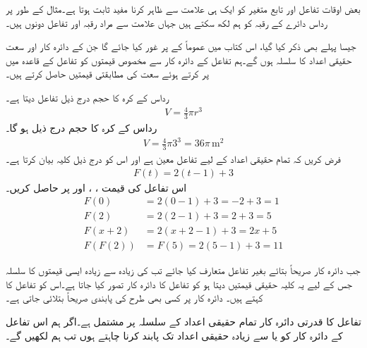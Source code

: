 بعض اوقات تفاعل اور تابع متغیر کو ایک ہی علامت سے ظاہر کرنا مفید ثابت ہوتا ہے۔مثال کے طور پر رداس  دائرے کے رقبہ کو ہم  لکھ سکتے ہیں جہاں علامت  سے مراد رقبہ اور تفاعل دونوں ہیں۔

جیسا پہلے بھی ذکر کیا گیا، اس کتاب میں عموماً  کے  پر غور کیا جائے گا جن کے دائرہ کار اور سعت حقیقی اعداد کا سلسلہ ہوں گے۔ہم تفاعل کے دائرہ کار سے مخصوص قیمتوں کو تفاعل کے قاعدہ میں پر کرتے ہوئے سعت کی مطابقتی قیمتیں حاصل کرتے ہیں۔

رداس  کے کرہ کا حجم  درج ذیل تفاعل دیتا ہے۔
\begin{align*}
V=\frac{4}{3}\pi r^3
\end{align*}
  رداس کے کرہ کا حجم درج ذیل ہو گا۔
\begin{align*}
V=\frac{4}{3}\pi 3^3=36\pi \, \si{\meter\squared}
\end{align*}
فرض کریں کہ تمام حقیقی اعداد  کے لیے  تفاعل معین ہے اور اس کو درج ذیل کلیہ بیان کرتا ہے۔
\begin{align*}
F(t)=2(t-1)+3
\end{align*}
اس تفاعل کی قیمت ، ،  اور  پر حاصل کریں۔\\
\begin{align*}
F(0)&=2(0-1)+3=-2+3=1\\
F(2)&=2(2-1)+3=2+3=5\\
F(x+2)&=2(x+2-1)+3=2x+5\\
F(F(2))&=F(5)=2(5-1)+3=11
\end{align*} 

جب دائرہ کار صریحاً بتائے بغیر تفاعل   متعارف کیا جائے تب  کی زیادہ سے زیادہ ایسی قیمتوں کا سلسلہ جس کے لیے یہ کلیہ حقیقی قیمتیں دیتا ہو کو تفاعل کا دائرہ کار تصور کیا جاتا ہے۔اس کو تفاعل کا  کہتے ہیں۔ دائرہ کار پر کسی بھی طرح کی پابندی  صریحاً بتلائی جاتی ہے۔

تفاعل  کا قدرتی دائرہ کار تمام حقیقی اعداد کے سلسلہ پر مشتمل ہے۔اگر ہم اس تفاعل کے دائرہ کار  کو  یا  سے زیادہ  حقیقی اعداد تک پابند کرنا چاہتے ہوں تب  ہم  لکھیں گے۔    

